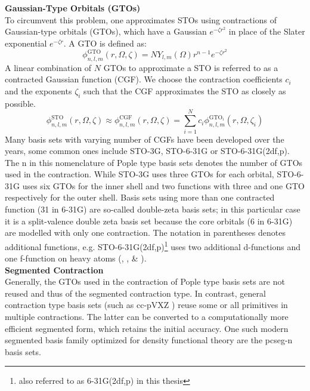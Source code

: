 \textbf{Gaussian-Type Orbitals (GTOs)}\\
To circumvent this problem, one approximates STOs using contractions of Gaussian-type orbitals (GTOs), which have a Gaussian $e^{-\zeta r^2}$ in place of the Slater exponential $e^{-\zeta r}$. A GTO is defined as: 
\begin{equation}
    \label{eq:gaussian_orbital}
    \phi_{n, l, m}^{\text{GTO}}(r, \Omega, \zeta) = N Y_{l,m}(\Omega) r^{n-1} e^{-\zeta r^2}
\end{equation}
A linear combination of $N$ GTOs to approximate a STO is referred to as a contracted Gaussian function (CGF). We choose the contraction coefficients $c_i$ and the exponents $\zeta_i$ such that the CGF approximates the STO as closely as possible. \\
\begin{equation}
    \phi_{n, l, m}^{\text{STO}}(r, \Omega, \zeta)  \approx \phi_{n, l, m}^{\text{CGF}}(r, \Omega, \zeta) = \sum_{i=1}^N c_i \phi_{n, l, m}^{\text{GTO}_i}(r, \Omega, \zeta_i)
\end{equation}
Many basis sets with varying number of CGFs have been developed over the years, some common ones include STO-3G, STO-6-31G or STO-6-31G(2df,p). The n in this nomenclature of Pople type basis sets \parencite{ref:pople_basis} denotes the number of GTOs used in the contraction. While STO-3G uses three GTOs for each orbital, STO-6-31G uses six GTOs for the inner shell and two functions with three and one GTO respectively for the outer shell. Basis sets using more than one contracted function (31 in 6-31G) are so-called double-zeta basis sets; in this particular case it is a split-valence double zeta basis set because the core orbitals (6 in 6-31G) are modelled with only one contraction. The notation in parentheses denotes additional functions, e.g. STO-6-31G(2df,p)\footnote{also referred to as 6-31G(2df,p) in this thesis} uses two additional d-functions and one f-function on heavy atoms (, ,  \& ). \\

\textbf{Segmented Contraction}\\
Generally, the GTOs used in the contraction of Pople type basis sets are not reused and thus of the segmented contraction type. In contrast, general contraction type basis sets (such as cc-pVXZ \parencite{ref:cc-pVXZ}) reuse some or all primitives in multiple contractions. The latter can be converted to a computationally more efficient segmented form, which retains the initial accuracy. One such modern segmented basis family optimized for density functional theory are the pcseg-n basis sets. \parencite{ref:Jensen2014pcs}\\

